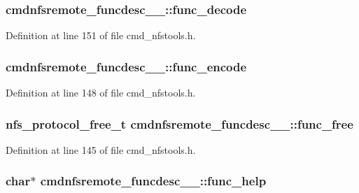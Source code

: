 \subsubsection[{func\_\-decode}]{ {\bf cmdnfsremote\_\-funcdesc\_\-\_\-::func\_\-decode}}\label{structcmdnfsremote__funcdesc_____7b9e9b51f910537ac80d0dc9b841c724}




Definition at line 151 of file cmd\_\-nfstools.h.
\subsubsection[{func\_\-encode}]{ {\bf cmdnfsremote\_\-funcdesc\_\-\_\-::func\_\-encode}}\label{structcmdnfsremote__funcdesc_____9cf690f0c21a6c1b4d661ce34dbc4bd2}




Definition at line 148 of file cmd\_\-nfstools.h.
\subsubsection[{func\_\-free}]{\setlength{\rightskip}{0pt plus 5cm}nfs\_\-protocol\_\-free\_\-t {\bf cmdnfsremote\_\-funcdesc\_\-\_\-::func\_\-free}}\label{structcmdnfsremote__funcdesc_____bc946e3094caf4906602f2901e71f9d0}




Definition at line 145 of file cmd\_\-nfstools.h.
\subsubsection[{func\_\-help}]{\setlength{\rightskip}{0pt plus 5cm}char$\ast$ {\bf cmdnfsremote\_\-funcdesc\_\-\_\-::func\_\-help}}\label{structcmdnfsremote__funcdesc_____c5d348039073f328e0b46258f2f11ed9}




